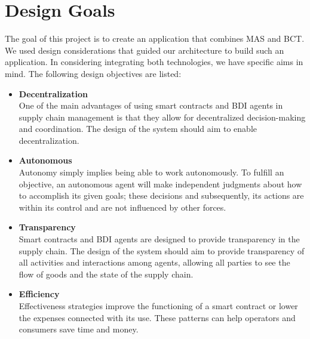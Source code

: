 \section{Design Goals}

The goal of this project is to create an application that combines \ac{MAS} and \ac{BCT}. We used design considerations that guided our architecture to build such an application.
In considering integrating both technologies, we have specific aims in mind. The following design objectives are listed:
\vspace{.5cm}
\begin{itemize}

    \item \textbf{Decentralization} \\ One of the main advantages of using smart contracts and \ac{BDI} agents in supply chain management is that they allow for decentralized decision-making and coordination. The design of the system should aim to enable decentralization.

    \vspace{.5cm}
    
    \item \textbf{Autonomous} \\Autonomy simply implies being able to work autonomously. To fulfill an objective, an autonomous agent will make independent judgments about how to accomplish its given goals; these decisions and subsequently, its actions are within its control and are not influenced by other forces.

    \vspace{.5cm}

    \item \textbf{Transparency} \\ Smart contracts and \ac{BDI} agents are designed to provide transparency in the supply chain. The design of the system should aim to provide transparency of all activities and interactions among agents, allowing all parties to see the flow of goods and the state of the supply chain.

    \vspace{.5cm}
    
    \item \textbf{Efficiency} \\
    Effectiveness strategies improve the functioning of a smart contract or lower the expenses connected with its use. These patterns can help operators and consumers save time and money.
    
    \vspace{.5cm}


\end{itemize}
